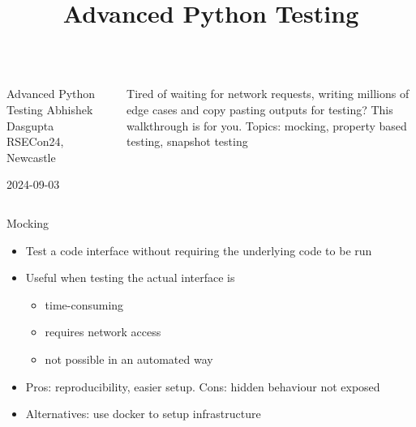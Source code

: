 \documentclass[11pt,xcolor={dvipsnames},hyperref={pdftex,pdfpagemode=UseNone,hidelinks,pdfdisplaydoctitle=true},usepdftitle=false]{beamer}
\begin{document}
\title{Advanced Python Testing}


\begin{frame}

  \begin{columns}
  \begin{column}{0.4\textwidth}
    {\LARGE Advanced Python Testing}
    \vskip 0.5cm
    Abhishek Dasgupta
    \vskip 2.5cm
    RSECon24, Newcastle

    2024-09-03
  \end{column}
  \begin{column}{0.4\textwidth}  %
    Tired of waiting for network requests, writing millions of edge cases
and copy pasting outputs for testing? This walkthrough is for you.
\vskip 0.5cm
Topics: mocking, property based testing, snapshot testing
  \end{column}
  \end{columns}
  \end{frame}




\begin{frame}{Mocking}
\label{mocking}
\begin{itemize}
\item
  Test a code interface without requiring the underlying code to be run
\item
  Useful when testing the actual interface is

  \begin{itemize}
  \item
    time-consuming
  \item
    requires network access
  \item
    not possible in an automated way
  \end{itemize}
\item Pros: reproducibility, easier setup. Cons: hidden behaviour not exposed
\item Alternatives: use docker to setup infrastructure
\end{itemize}
\end{frame}
\end{document}
